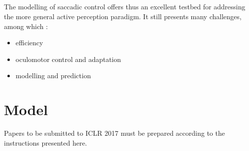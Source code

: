 \documentclass{article} %
\begin{document}
	
	\subsection{}
	
	
	
	
	The modelling of saccadic control offers thus an excellent testbed for addressing the more general active perception paradigm. It still presents many challenges, among which :
	\begin{itemize}
		\item efficiency
		\item oculomotor control and adaptation
		\item modelling and prediction
	\end{itemize}
	



\section{Model}

Papers to be submitted to ICLR 2017 must be prepared according to the
instructions presented here.

\end{document}
